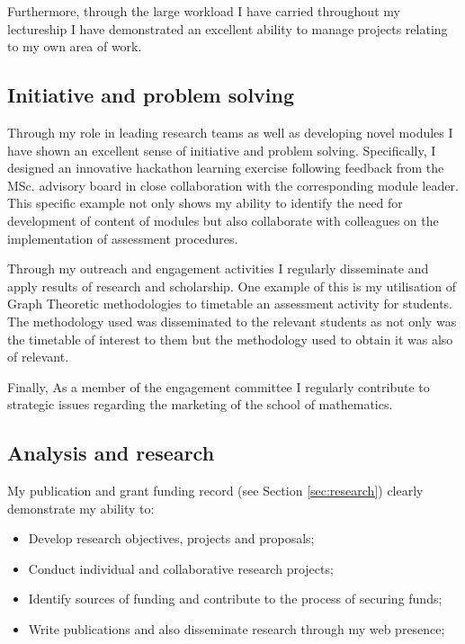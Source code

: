 \documentclass{article}
\begin{document}
Furthermore, through the large workload I have carried throughout my lectureship I have demonstrated an excellent ability to manage projects relating to my own area of work.

\subsection{Initiative and problem solving}

Through my role in leading research teams as well as developing novel modules I have shown an excellent sense of initiative and problem solving.
Specifically, I designed an innovative hackathon learning exercise following feedback from the MSc. advisory board in close collaboration with the corresponding module leader.
This specific example not only shows my ability to identify the need for development of content of modules but also collaborate with colleagues on the implementation of assessment procedures.

Through my outreach and engagement activities I regularly disseminate and apply results of research and scholarship.
One example of this is my utilisation of Graph Theoretic methodologies to timetable an assessment activity for students.
The methodology used was disseminated to the relevant students as not only was the timetable of interest to them but the methodology used to obtain it was also of relevant.

Finally, As a member of the engagement committee I regularly contribute to strategic issues regarding the marketing of the school of mathematics.

\subsection{Analysis and research}

My publication and grant funding record (see Section \ref{sec:research}) clearly demonstrate my ability to:

\begin{itemize}
    \item Develop research objectives, projects and proposals;
    \item Conduct individual and collaborative research projects;
    \item Identify sources of funding and contribute to the process of securing funds;
    \item Write publications and also disseminate research through my web presence;
\end{itemize}
\end{document}
